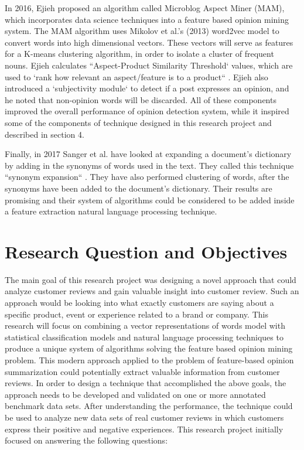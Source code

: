 \documentclass{sig-alternate}
\begin{document}
In 2016, Ejieh proposed an algorithm called Microblog Aspect Miner (MAM), which incorporates data science techniques into a feature based opinion mining system. The MAM algorithm uses Mikolov et al.'s (2013) word2vec model to convert words into high dimensional vectors. These vectors will serve as features for a K-means clustering algorithm, in order to isolate a cluster of frequent nouns. Ejieh calculates ``Aspect-Product Similarity Threshold` values, which are used to `rank how relevant an aspect/feature is to a product``  \cite{Ejieh2016}. Ejieh also introduced a `subjectivity module` to detect if a post expresses an opinion, and he noted that non-opinion words will be discarded. All of these components improved the overall performance of opinion detection system, while it inspired some of the components of technique designed in this research project and described in section 4. 

Finally, in 2017 Sanger et al. have looked at expanding a document's dictionary by adding in the synonyms of words used in the text. They called this technique ``synonym expansion`` \cite{SangerLeserKlinger2017}. They have also performed clustering of words, after the synonyms have been added to the document's dictionary. Their results are promising and their system of algorithms could be considered to be added inside a feature extraction natural language processing technique.

\section{Research Question and Objectives}
The main goal of this research project was designing a novel approach that could analyze customer reviews and gain valuable insight into customer review. Such an approach would be looking into what exactly customers are saying about a specific product, event or experience related to a brand or company. This research will focus on combining a vector representations of words model with statistical classification models and natural language processing techniques  to produce a unique system of algorithms solving the feature based opinion mining problem. This modern approach applied to the problem of feature-based opinion summarization could potentially extract valuable information from customer reviews.
In order to design a technique that accomplished the above goals, the approach needs to be developed and validated on one or more annotated benchmark data sets. After understanding the performance, the technique could be used to analyze new data sets of real customer reviews in which customers express their positive and negative experiences. This research project initially focused on answering the following questions: 
\end{document}
